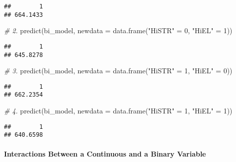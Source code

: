 \documentclass[
]{article}
\newenvironment{Shaded}{\begin{snugshade}}{\end{snugshade}}
\newcommand{\AttributeTok}[1]{\textcolor[rgb]{0.77,0.63,0.00}{#1}}
\newcommand{\CommentTok}[1]{\textcolor[rgb]{0.56,0.35,0.01}{\textit{#1}}}
\newcommand{\DecValTok}[1]{\textcolor[rgb]{0.00,0.00,0.81}{#1}}
\newcommand{\FunctionTok}[1]{\textcolor[rgb]{0.00,0.00,0.00}{#1}}
\newcommand{\NormalTok}[1]{#1}
\newcommand{\OtherTok}[1]{\textcolor[rgb]{0.56,0.35,0.01}{#1}}
\newcommand{\StringTok}[1]{\textcolor[rgb]{0.31,0.60,0.02}{#1}}
\begin{document}
\begin{verbatim}
##        1 
## 664.1433
\end{verbatim}

\begin{Shaded}
\begin{Highlighting}[]
\CommentTok{\# 2.}
\FunctionTok{predict}\NormalTok{(bi\_model, }\AttributeTok{newdata =} \FunctionTok{data.frame}\NormalTok{(}\StringTok{"HiSTR"} \OtherTok{=} \DecValTok{0}\NormalTok{, }\StringTok{"HiEL"} \OtherTok{=} \DecValTok{1}\NormalTok{))}
\end{Highlighting}
\end{Shaded}

\begin{verbatim}
##        1 
## 645.8278
\end{verbatim}

\begin{Shaded}
\begin{Highlighting}[]
\CommentTok{\# 3.}
\FunctionTok{predict}\NormalTok{(bi\_model, }\AttributeTok{newdata =} \FunctionTok{data.frame}\NormalTok{(}\StringTok{"HiSTR"} \OtherTok{=} \DecValTok{1}\NormalTok{, }\StringTok{"HiEL"} \OtherTok{=} \DecValTok{0}\NormalTok{))}
\end{Highlighting}
\end{Shaded}

\begin{verbatim}
##        1 
## 662.2354
\end{verbatim}

\begin{Shaded}
\begin{Highlighting}[]
\CommentTok{\# 4.}
\FunctionTok{predict}\NormalTok{(bi\_model, }\AttributeTok{newdata =} \FunctionTok{data.frame}\NormalTok{(}\StringTok{"HiSTR"} \OtherTok{=} \DecValTok{1}\NormalTok{, }\StringTok{"HiEL"} \OtherTok{=} \DecValTok{1}\NormalTok{))}
\end{Highlighting}
\end{Shaded}

\begin{verbatim}
##        1 
## 640.6598
\end{verbatim}

\hypertarget{interactions-between-a-continuous-and-a-binary-variable}{%
\paragraph*{Interactions Between a Continuous and a Binary
Variable}\label{interactions-between-a-continuous-and-a-binary-variable}}
\end{document}
